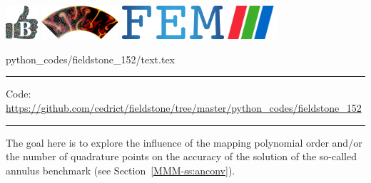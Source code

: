 \noindent
\includegraphics[height=1.25cm]{images/pictograms/benchmark}
\includegraphics[height=1.25cm]{images/pictograms/aspect_logo}
\includegraphics[height=1.25cm]{images/pictograms/FEM}
\includegraphics[height=1.25cm]{images/pictograms/paraview}



\begin{flushright} {\tiny {\color{gray} python\_codes/fieldstone\_152/text.tex}} \end{flushright}



\par\noindent\rule{\textwidth}{0.4pt}

\begin{center}
\inpython
{\small Code: \url{https://github.com/cedrict/fieldstone/tree/master/python_codes/fieldstone_152}}
\end{center}

\par\noindent\rule{\textwidth}{0.4pt}





The goal here is to explore the influence of the mapping polynomial order and/or
the number of quadrature points on the accuracy of the solution of the so-called 
annulus benchmark (see Section~\ref{MMM-ss:anconv}).

